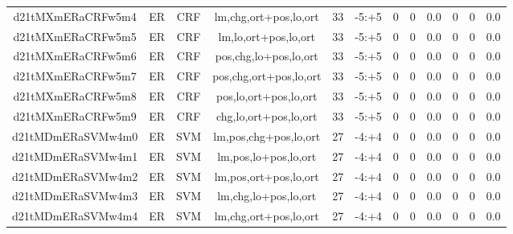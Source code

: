\documentclass[a4paper]{article}
\begin{document}
\begin{landscape}
\begin{center}
\begin{tabular}{ |c|c|c|c|c|c|c|c|c|c|c|c|}
 
 	
 	\small{ d21tMXmERaCRFw5m4 } & ER & CRF & lm,chg,ort+pos,lo,ort  &  33 &  -5:+5  &  0 & 0 & 0.0  &  0 & 0 & 0.0 \\
 	

 
 	
 	\small{ d21tMXmERaCRFw5m5 } & ER & CRF & lm,lo,ort+pos,lo,ort  &  33 &  -5:+5  &  0 & 0 & 0.0  &  0 & 0 & 0.0 \\
 	

 
 	
 	\small{ d21tMXmERaCRFw5m6 } & ER & CRF & pos,chg,lo+pos,lo,ort  &  33 &  -5:+5  &  0 & 0 & 0.0  &  0 & 0 & 0.0 \\
 	

 
 	
 	\small{ d21tMXmERaCRFw5m7 } & ER & CRF & pos,chg,ort+pos,lo,ort  &  33 &  -5:+5  &  0 & 0 & 0.0  &  0 & 0 & 0.0 \\
 	

 
 	
 	\small{ d21tMXmERaCRFw5m8 } & ER & CRF & pos,lo,ort+pos,lo,ort  &  33 &  -5:+5  &  0 & 0 & 0.0  &  0 & 0 & 0.0 \\
 	

 
 	
 	\small{ d21tMXmERaCRFw5m9 } & ER & CRF & chg,lo,ort+pos,lo,ort  &  33 &  -5:+5  &  0 & 0 & 0.0  &  0 & 0 & 0.0 \\
 	

 
 	
 	\small{ d21tMDmERaSVMw4m0 } & ER & SVM & lm,pos,chg+pos,lo,ort  &  27 &  -4:+4  &  0 & 0 & 0.0  &  0 & 0 & 0.0 \\
 	

 
 	
 	\small{ d21tMDmERaSVMw4m1 } & ER & SVM & lm,pos,lo+pos,lo,ort  &  27 &  -4:+4  &  0 & 0 & 0.0  &  0 & 0 & 0.0 \\
 	

 
 	
 	\small{ d21tMDmERaSVMw4m2 } & ER & SVM & lm,pos,ort+pos,lo,ort  &  27 &  -4:+4  &  0 & 0 & 0.0  &  0 & 0 & 0.0 \\
 	

 
 	
 	\small{ d21tMDmERaSVMw4m3 } & ER & SVM & lm,chg,lo+pos,lo,ort  &  27 &  -4:+4  &  0 & 0 & 0.0  &  0 & 0 & 0.0 \\
 	

 
 	
 	\small{ d21tMDmERaSVMw4m4 } & ER & SVM & lm,chg,ort+pos,lo,ort  &  27 &  -4:+4  &  0 & 0 & 0.0  &  0 & 0 & 0.0 \\
 	


\end{tabular}
\end{center}
\end{landscape}
\end{document}

